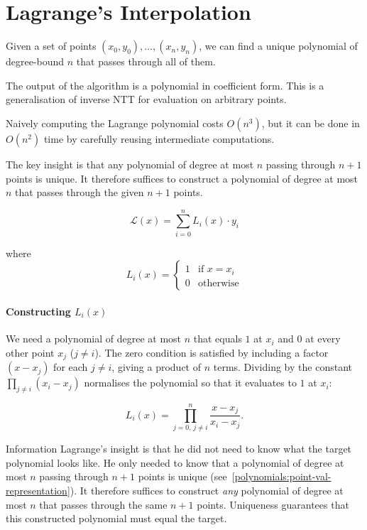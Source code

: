 \section{Lagrange's Interpolation} \label{lagrange-interpolation}
Given a set of points $(x_0,y_0),\dots,(x_n,y_n)$, 
we can find a unique polynomial of degree-bound $n$ that passes through all of them.

The output of the algorithm is a polynomial in coefficient form.
This is a generalisation of inverse NTT for evaluation on 
arbitrary points.

Naively computing the Lagrange polynomial costs $O(n^3)$, but it can be done in $O(n^2)$ time by carefully reusing intermediate computations.

The key insight is that any polynomial of degree at most $n$ passing through $n+1$ points is unique. It therefore suffices to construct a polynomial of degree at most $n$ that passes through the given $n+1$ points.

\[\mathcal{L}(x)=\sum_{i=0}^{n}{L_i(x)\cdot y_i}\]

where \[L_i(x) =
\begin{cases}
  1 & \text{if } x=x_i \\
  0 & \text{otherwise}
\end{cases}\]

\paragraph{Constructing \(L_i(x)\)}

We need a polynomial of degree at most $n$ that equals $1$ at $x_i$ and $0$ at every other point $x_j$ ($j \neq i$).
The zero condition is satisfied by including a factor $(x - x_j)$ for each $j \neq i$, giving a product of $n$ terms.
Dividing by the constant $\prod_{j \neq i}(x_i - x_j)$ normalises the polynomial so that it evaluates to $1$ at $x_i$:

\[L_i(x) = \prod_{j=0,\, j \neq i}^{n} \frac{x - x_j}{x_i - x_j}.\]

\begin{notice}{Information}
  Lagrange's insight is that he did not need to know what the target polynomial looks like.
  He only needed to know that a polynomial of degree at most $n$ passing through $n+1$ points is unique
  (see~\ref{polynomials:point-val-representation}).
  It therefore suffices to construct \emph{any} polynomial of degree at most $n$ that passes through the same $n+1$ points.
  Uniqueness guarantees that this constructed polynomial must equal the target.
\end{notice}


